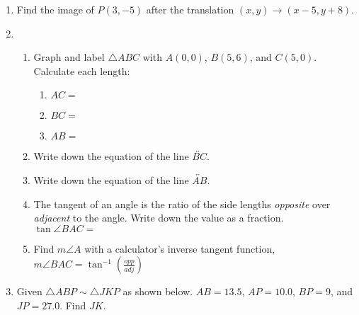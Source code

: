 \documentclass[12pt, twoside]{article}
\begin{document}
\begin{enumerate}
  \item Find the image of $P(3,-5)$ after the translation $(x,y) \rightarrow (x-5,y+8)$.
\newpage
  \item \begin{enumerate}[itemsep=1.5cm]
    \item Graph and label $\triangle ABC$ with $A(0,0)$, $B(5,6)$, and $C(5,0)$. Calculate each length:
    \begin{multicols}{2}
      \begin{enumerate}[itemsep=1.5cm]
        \item $AC=$
        \item $BC=$
        \item $AB=$ \vspace{3cm}
      \end{enumerate}
    \begin{center}
    \end{center}
  \end{multicols}%
    \item Write down the equation of the line $\overleftrightarrow{BC}$.
    \item Write down the equation of the line $\overleftrightarrow{AB}$. 
    \item The tangent of an angle is the ratio of the side lengths \emph{opposite} over \emph{adjacent} to the angle. Write down the value as a fraction. \\[0.5cm]
      $\tan \angle BAC=$
    \item Find $m\angle A$ with a calculator's inverse tangent function, $\displaystyle m \angle BAC = \tan^{-1}(\frac{opp}{adj})$
    \vspace{2cm}
  \end{enumerate}

\newpage
  \item Given $\triangle ABP \sim \triangle JKP$ as shown below. $AB=13.5$, $AP=10.0$, $BP=9$, and $JP=27.0$. Find $JK$.
    \begin{flushright}
      \end{flushright}
      \vspace{0.5cm}
      

\end{enumerate}
\end{document}

